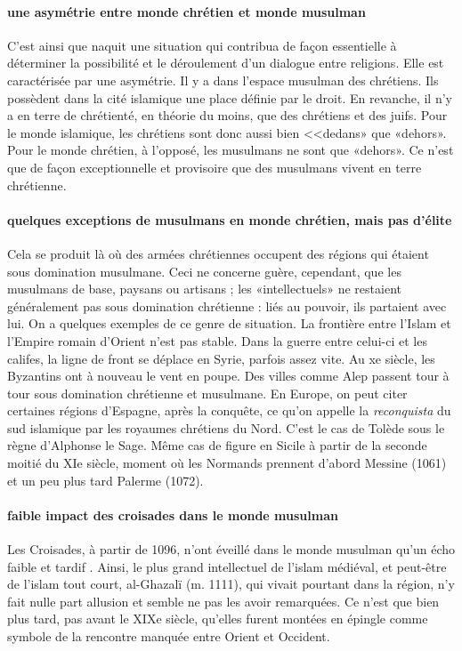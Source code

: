 \paragraph{une asymétrie entre monde chrétien et monde musulman}
C'est ainsi que naquit une situation qui contribua de façon essentielle à déterminer la possibilité et le déroulement d'un dialogue entre religions. Elle est caractérisée par une asymétrie. Il y a dans l'espace musulman des chrétiens. Ils possèdent dans la cité islamique une place définie par le droit. En revanche, il n'y a en
terre de chrétienté, en théorie du moins, que des chrétiens et des juifs. Pour le monde islamique, les chrétiens sont donc aussi bien
<<dedans» que «dehors». Pour le monde chrétien, à l'opposé, les musulmans ne sont que «dehors». Ce n'est que de façon exceptionnelle et provisoire que des musulmans vivent en terre chrétienne.

\paragraph{quelques exceptions de musulmans en monde chrétien, mais pas d'élite}
Cela se produit là où des armées chrétiennes occupent des régions qui étaient sous domination musulmane. Ceci ne concerne guère, cependant, que les musulmans de base, paysans ou artisans ; les «intellectuels» ne restaient généralement pas sous domination chrétienne : liés au pouvoir, ils partaient avec lui. On a quelques exemples de ce genre de situation. La frontière entre l'Islam et l'Empire romain d'Orient n'est pas stable. Dans la guerre entre celui-ci et les califes, la ligne de front se déplace en Syrie, parfois assez vite. Au xe siècle, les Byzantins ont à nouveau le vent en poupe. Des villes comme Alep passent tour à tour sous domination chrétienne et musulmane. En Europe, on peut citer certaines régions d'Espagne, après la conquête, ce qu'on appelle la \textit{reconquista} du sud islamique par les royaumes chrétiens du Nord. C'est le cas de Tolède sous le règne d'Alphonse le Sage. Même cas de figure en Sicile à partir de la seconde moitié du XIe siècle, moment où les Normands prennent d'abord Messine (1061) et un peu plus tard Palerme (1072).
\paragraph{faible impact des croisades dans le monde musulman}
Les Croisades, à partir de 1096, n'ont éveillé dans le monde musulman qu'un écho faible et tardif . Ainsi, le plus grand intellectuel de l'islam médiéval, et peut-être de l'islam tout court, al-Ghazalï (m. 1111), qui vivait pourtant dans la région, n'y fait nulle part allusion et semble ne pas les avoir remarquées. Ce n'est que bien plus tard, pas avant le XIXe siècle, qu'elles furent montées en épingle comme symbole de la rencontre manquée entre Orient et Occident.

